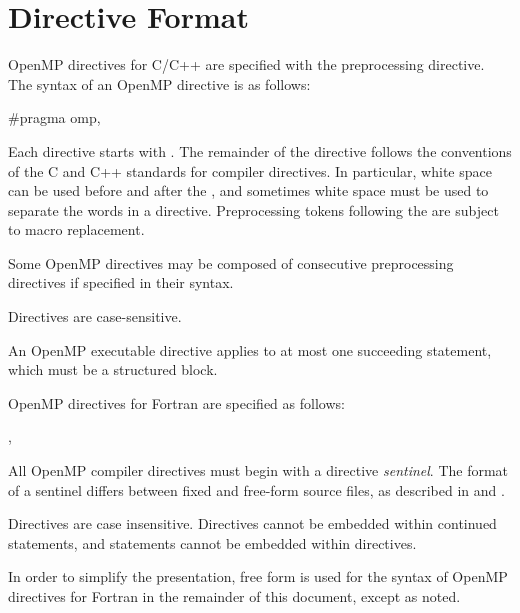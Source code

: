 \section{Directive Format}
\label{sec:Directive Format}
\begin{ccppspecific}
OpenMP directives for C/C++ are specified with the  preprocessing directive.
The syntax of an OpenMP directive is as follows:

\begin{ompcPragma}
#pragma omp\plc{ directive-name [clause[ [},\plc{] clause] ... ] new-line}
\end{ompcPragma}

Each directive  starts with  . The remainder of the directive follows the
conventions of the C and C++ standards for compiler directives. In particular, white
space can be used before and after the \pcode{\#}, and sometimes white space must be used to
separate the words in a directive. Preprocessing tokens following the  
are subject to macro replacement.

Some OpenMP directives may be composed of consecutive  preprocessing
directives if specified in their syntax.

Directives are case-sensitive.

An OpenMP executable directive applies to at most one succeeding statement, which
must be a structured block.
\end{ccppspecific}

\begin{fortranspecific}
OpenMP directives for Fortran are specified as follows:

\begin{ompfPragma}
\plc{sentinel directive-name [clause[ [},\plc{] clause]...]}
\end{ompfPragma}

All OpenMP compiler directives must begin with a directive \emph{sentinel}. The format of a
sentinel differs between fixed and free-form source files, as described in
 and .

Directives are case insensitive. Directives cannot be embedded within continued
statements, and statements cannot be embedded within directives.

In order to simplify the presentation, free form is used for the syntax of OpenMP
directives for Fortran in the remainder of this document, except as noted.
\end{fortranspecific}

